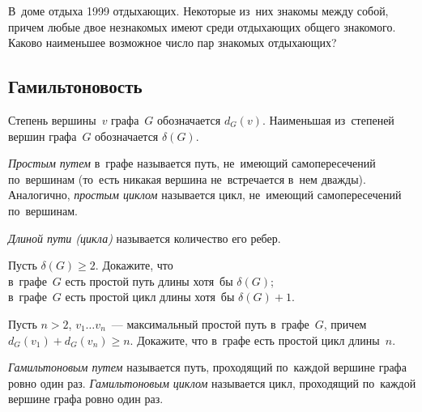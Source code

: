 


\begin{problems}

\item
В~доме отдыха 1999 отдыхающих.
Некоторые из~них знакомы между собой, причем любые двое незнакомых имеют среди
отдыхающих общего знакомого.
Каково наименьшее возможное число пар знакомых отдыхающих?

\end{problems}


\subsection*{Гамильтоновость}

Степень вершины~$v$ графа~$G$ обозначается $d_{G}(v)$.
Наименьшая из~степеней вершин графа~$G$ обозначается $\delta(G)$.

\emph{Простым путем} в~графе называется путь, не~имеющий самопересечений
по~вершинам (то~есть никакая вершина не~встречается в~нем дважды).
Аналогично, \emph{простым циклом} называется цикл, не~имеющий самопересечений
по~вершинам.

\emph{Длиной пути (цикла)} называется количество его ребер.

\begin{problems}

\item
Пусть $\delta(G) \geq 2$.
Докажите, что
\\
\subproblem
в~графе~$G$ есть простой путь длины хотя~бы $\delta(G)$;
\\
\subproblem
в~графе~$G$ есть простой цикл длины хотя~бы $\delta(G) + 1$.

\item
Пусть $n > 2$, $v_{1} \ldots v_{n}$~--- максимальный простой путь в~графе~$G$,
причем \( d_{G}(v_{1}) + d_{G}(v_{n}) \geq n \).
Докажите, что в~графе есть простой цикл длины~$n$.

\end{problems}

\emph{Гамильтоновым путем} называется путь, проходящий по~каждой вершине графа
ровно один раз.
\emph{Гамильтоновым циклом} называется цикл, проходящий по~каждой вершине графа
ровно один раз.

